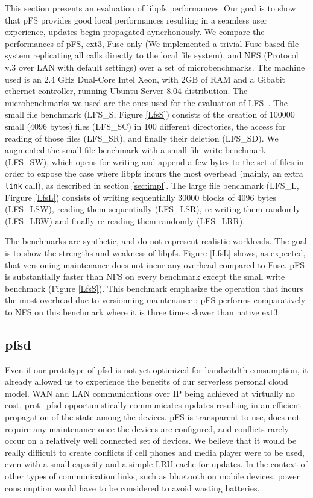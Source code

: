 This section presents an evaluation of libpfs performances. Our goal is
to show that pFS provides good local performances resulting in a
seamless user experience, updates begin propagated ayncrhonously. We
compare the performances of pFS, ext3, Fuse only (We implemented a
trivial Fuse based file system replicating all calls directly to the
local file system), and NFS (Protocol v.3 over LAN with default
settings) over a set of microbenchmarks. The machine used is an 2.4
GHz Dual-Core Intel Xeon, with 2GB of RAM and a Gibabit ethernet
controller, running Ubuntu Server 8.04 distribution. The
microbenchmarks we used are the ones used for the evaluation of
LFS~\cite{rosenblum:lfs}. The small file benchmark (LFS\_S, Figure
\ref{LfsS}) consists of the creation of 100000 small (4096 bytes)
files (LFS\_SC) in 100 different directories, the access for reading
of those files (LFS\_SR), and finally their deletion (LFS\_SD). We
augmented the small file benchmark with a small file write benchmark
(LFS\_SW), which opens for writing and append a few bytes to the set
of files in order to expose the case where libpfs incurs the most
overhead (mainly, an extra {\tt link} call), as described in section
\ref{sec:impl}. The large file benchmark (LFS\_L, Firgure \ref{LfsL})
consists of writing sequentially 30000 blocks of 4096 bytes
(LFS\_LSW), reading them sequentially (LFS\_LSR), re-writing them
randomly (LFS\_LRW) and finally re-reading them randomly (LFS\_LRR).

The benchmarks are synthetic, and do not represent realistic
workloads. The goal is to show the strengths and weakness of
libpfs. Figure \ref{LfsL} shows, as expected, that versioning
maintenance does not incur any overhead compared to Fuse. pFS is
substantially faster than NFS on every benchmark except the small
write benchmark (Figure \ref{LfsS}). This benchmark emphasize the
operation that incurs the most overhead due to versionning maintenance
: pFS performs comparatively to NFS on this benchmark where it is
three times slower than native ext3.

\subsection{pfsd}

Even if our prototype of pfsd is not yet optimized for bandwitdth
consumption, it already allowed us to experience the benefits of our
serverless personal cloud model. WAN and LAN communications over IP
being achieved at virtually no cost, prot\_pfsd opportunistically
communicates updates resulting in an efficient propagation of the
state among the devices. pFS is transparent to use, does not require
any maintenance once the devices are configured, and conflicts rarely
occur on a relatively well connected set of devices. We believe that
it would be really difficult to create conflicts if cell phones and
media player were to be used, even with a small capacity and a simple
LRU cache for updates. In the context of other types of communication
links, such as bluetooth on mobile devices, power consumption would
have to be considered to avoid wasting batteries.

